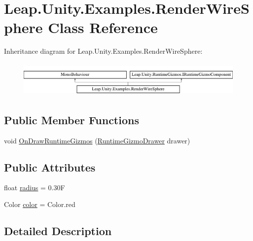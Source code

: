 \hypertarget{class_leap_1_1_unity_1_1_examples_1_1_render_wire_sphere}{}\section{Leap.\+Unity.\+Examples.\+Render\+Wire\+Sphere Class Reference}
\label{class_leap_1_1_unity_1_1_examples_1_1_render_wire_sphere}
Inheritance diagram for Leap.\+Unity.\+Examples.\+Render\+Wire\+Sphere\+:\begin{figure}[H]
\begin{center}
\leavevmode
\includegraphics[height=1.772152cm]{class_leap_1_1_unity_1_1_examples_1_1_render_wire_sphere}
\end{center}
\end{figure}
\subsection*{Public Member Functions}
\begin{DoxyCompactItemize}
\item 
void \mbox{\hyperlink{class_leap_1_1_unity_1_1_examples_1_1_render_wire_sphere_afc935457f41e834980d3b143125fc2e6}{On\+Draw\+Runtime\+Gizmos}} (\mbox{\hyperlink{class_leap_1_1_unity_1_1_runtime_gizmos_1_1_runtime_gizmo_drawer}{Runtime\+Gizmo\+Drawer}} drawer)
\end{DoxyCompactItemize}
\subsection*{Public Attributes}
\begin{DoxyCompactItemize}
\item 
float \mbox{\hyperlink{class_leap_1_1_unity_1_1_examples_1_1_render_wire_sphere_a47a851eb3662e260db097c3da1e5b7e7}{radius}} = 0.\+30F
\item 
Color \mbox{\hyperlink{class_leap_1_1_unity_1_1_examples_1_1_render_wire_sphere_a8f446b646d34884cbe051caee8195642}{color}} = Color.\+red
\end{DoxyCompactItemize}


\subsection{Detailed Description}


